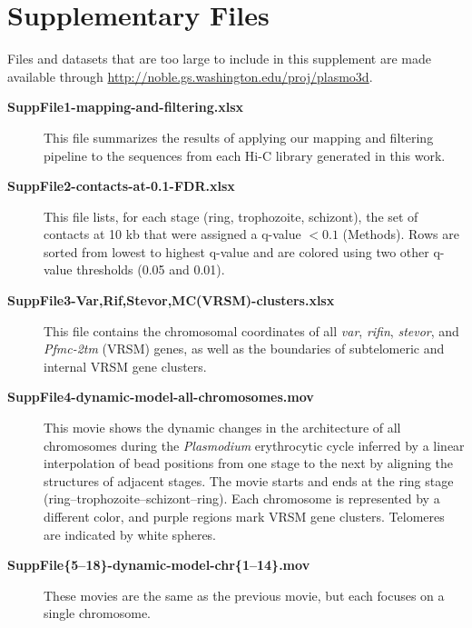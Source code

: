 \documentclass{article}
\begin{document}
\begin{center}
\begin{flushleft}
\setlength{\baselineskip}{1.25\baselineskip}
\hypertarget{supplementaryfiles}{\section*{Supplementary Files}}
    Files and datasets that are too large to include in this supplement are made available through \url{http://noble.gs.washington.edu/proj/plasmo3d}.

\begin{description}
	\item[\textbf{SuppFile1-mapping-and-filtering.xlsx}] This file summarizes the
        results of applying our mapping and filtering pipeline to the sequences from
        each Hi-C library generated in this work.

    \item[\textbf{SuppFile2-contacts-at-0.1-FDR.xlsx}] This file lists, for each stage
        (ring, trophozoite, schizont), the set of contacts at 10 kb that were assigned
        a q-value $< 0.1$ (Methods). Rows are sorted from lowest to highest q-value and
        are colored using two other q-value thresholds (0.05 and 0.01).

    \item[\textbf{SuppFile3-Var,Rif,Stevor,MC(VRSM)-clusters.xlsx}] This file contains
        the chromosomal coordinates of all \emph{var}, \emph{rifin}, \emph{stevor}, and
        \emph{Pfmc-2tm} (VRSM) genes, as well as the boundaries of subtelomeric and internal
        VRSM gene clusters.

    \item[\textbf{SuppFile4-dynamic-model-all-chromosomes.mov}] This movie
        shows the dynamic changes in the architecture of all chromosomes during
        the \emph{Plasmodium} erythrocytic cycle inferred by a linear interpolation
        of bead positions from one stage to the next by aligning the structures
        of adjacent stages. The movie starts and ends at the ring stage
        (ring--trophozoite--schizont--ring). Each chromosome is represented
        by a different color, and purple regions mark VRSM gene clusters.
        Telomeres are indicated by white spheres.

    \item[\textbf{SuppFile\{5--18\}-dynamic-model-chr\{1--14\}.mov}]
        These movies are the same as the previous movie, but each focuses on a single chromosome.
\end{description}
\end{flushleft}
\end{center}
\end{document}
